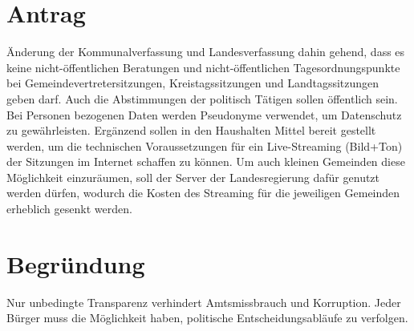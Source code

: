 \section{Antrag}

Änderung der Kommunalverfassung und Landesverfassung dahin gehend, dass es keine nicht-öffentlichen Beratungen und nicht-öffentlichen Tagesordnungspunkte bei Gemeindevertretersitzungen, Kreistagssitzungen und Landtagssitzungen geben darf. Auch die Abstimmungen der politisch Tätigen sollen öffentlich sein. Bei Personen bezogenen Daten werden Pseudonyme verwendet, um Datenschutz zu gewährleisten. Ergänzend sollen in den Haushalten Mittel bereit gestellt werden, um die technischen Voraussetzungen für ein Live-Streaming (Bild+Ton) der Sitzungen im Internet schaffen zu können. Um auch kleinen Gemeinden diese Möglichkeit einzuräumen, soll der Server der Landesregierung dafür genutzt werden dürfen, wodurch die Kosten des Streaming für die jeweiligen Gemeinden erheblich gesenkt werden.

\section{Begründung}

Nur unbedingte Transparenz verhindert Amtsmissbrauch und Korruption. Jeder Bürger muss die Möglichkeit haben, politische Entscheidungsabläufe zu verfolgen.
